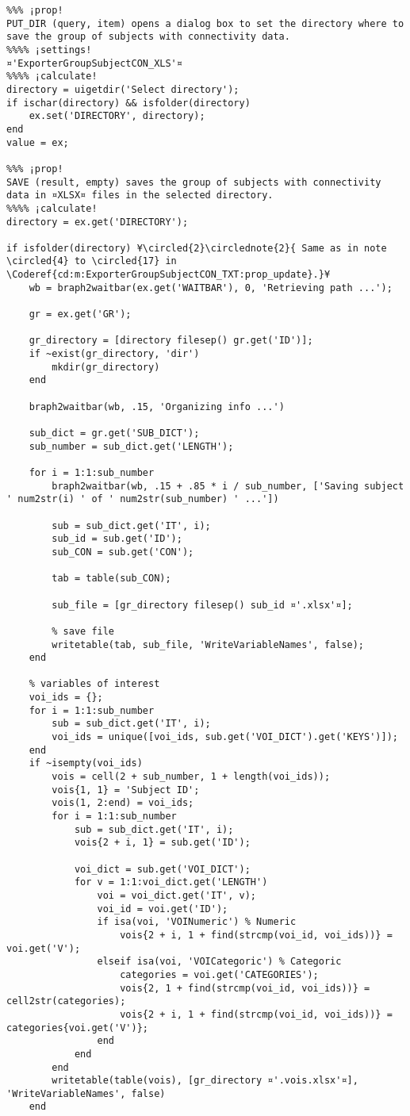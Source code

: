 \documentclass{tufte-handout}
\begin{document}
\begin{lstlisting}
%%% ¡prop!
PUT_DIR (query, item) opens a dialog box to set the directory where to save the group of subjects with connectivity data.
%%%% ¡settings!
¤'ExporterGroupSubjectCON_XLS'¤
%%%% ¡calculate!
directory = uigetdir('Select directory');
if ischar(directory) && isfolder(directory)
    ex.set('DIRECTORY', directory);
end
value = ex;

%%% ¡prop!
SAVE (result, empty) saves the group of subjects with connectivity data in ¤XLSX¤ files in the selected directory.
%%%% ¡calculate!
directory = ex.get('DIRECTORY');

if isfolder(directory) ¥\circled{2}\circlednote{2}{ Same as in note \circled{4} to \circled{17} in \Coderef{cd:m:ExporterGroupSubjectCON_TXT:prop_update}.}¥
    wb = braph2waitbar(ex.get('WAITBAR'), 0, 'Retrieving path ...');
    
    gr = ex.get('GR');

    gr_directory = [directory filesep() gr.get('ID')];
    if ~exist(gr_directory, 'dir')
        mkdir(gr_directory)
    end
    
	braph2waitbar(wb, .15, 'Organizing info ...')
    
    sub_dict = gr.get('SUB_DICT');
    sub_number = sub_dict.get('LENGTH');

    for i = 1:1:sub_number
        braph2waitbar(wb, .15 + .85 * i / sub_number, ['Saving subject ' num2str(i) ' of ' num2str(sub_number) ' ...'])
        
        sub = sub_dict.get('IT', i);
        sub_id = sub.get('ID');
        sub_CON = sub.get('CON');
        
        tab = table(sub_CON);

        sub_file = [gr_directory filesep() sub_id ¤'.xlsx'¤];

        % save file
        writetable(tab, sub_file, 'WriteVariableNames', false);
    end
    
    % variables of interest
    voi_ids = {};
    for i = 1:1:sub_number
        sub = sub_dict.get('IT', i);
        voi_ids = unique([voi_ids, sub.get('VOI_DICT').get('KEYS')]);
    end
    if ~isempty(voi_ids)
        vois = cell(2 + sub_number, 1 + length(voi_ids));
        vois{1, 1} = 'Subject ID';
        vois(1, 2:end) = voi_ids;
        for i = 1:1:sub_number
            sub = sub_dict.get('IT', i);
            vois{2 + i, 1} = sub.get('ID');
            
            voi_dict = sub.get('VOI_DICT');
            for v = 1:1:voi_dict.get('LENGTH')
                voi = voi_dict.get('IT', v);
                voi_id = voi.get('ID');
                if isa(voi, 'VOINumeric') % Numeric
                    vois{2 + i, 1 + find(strcmp(voi_id, voi_ids))} = voi.get('V');
                elseif isa(voi, 'VOICategoric') % Categoric
                    categories = voi.get('CATEGORIES');
                    vois{2, 1 + find(strcmp(voi_id, voi_ids))} = cell2str(categories);
                    vois{2 + i, 1 + find(strcmp(voi_id, voi_ids))} = categories{voi.get('V')};
                end
            end
        end
        writetable(table(vois), [gr_directory ¤'.vois.xlsx'¤], 'WriteVariableNames', false)
    end


\end{lstlisting}
\end{document}
